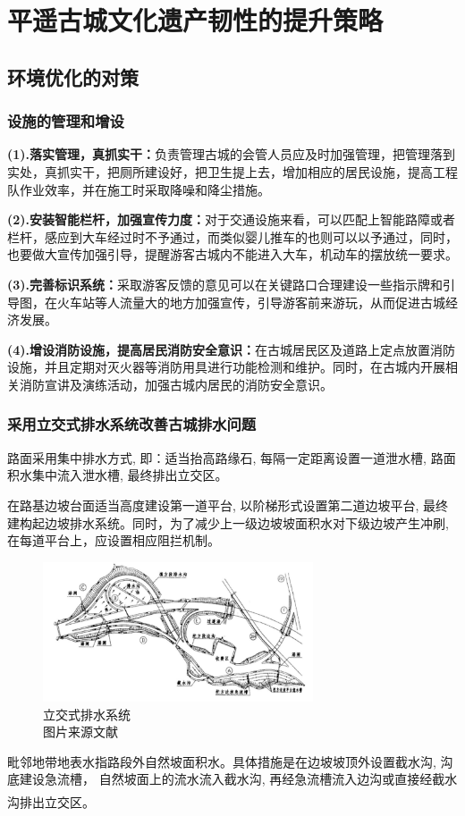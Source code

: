 \documentclass[UTF8]{ctexart}
\newcommand{\upcite}[1]{\textsuperscript{\textsuperscript{\cite{#1}}}}
\begin{document}
\section{平遥古城文化遗产韧性的提升策略}
    \subsection{环境优化的对策}
        \subsubsection{设施的管理和增设}
\textbf{(1).落实管理，真抓实干：}负责管理古城的会管人员应及时加强管理，把管理落到实处，真抓实干，把厕所建设好，把卫生提上去，增加相应的居民设施，提高工程队作业效率，并在施工时采取降噪和降尘措施。

\textbf{(2).安装智能栏杆，加强宣传力度：}对于交通设施来看，可以匹配上智能路障或者栏杆，感应到大车经过时不予通过，而类似婴儿推车的也则可以以予通过，同时，也要做大宣传加强引导，提醒游客古城内不能进入大车，机动车的摆放统一要求。

\textbf{(3).完善标识系统：}采取游客反馈的意见可以在关键路口合理建设一些指示牌和引导图，在火车站等人流量大的地方加强宣传，引导游客前来游玩，从而促进古城经济发展。

\textbf{(4).增设消防设施，提高居民消防安全意识：}在古城居民区及道路上定点放置消防设施，并且定期对灭火器等消防用具进行功能检测和维护。同时，在古城内开展相关消防宣讲及演练活动，加强古城内居民的消防安全意识。

        \subsubsection{采用立交式排水系统改善古城排水问题}
        路面采用集中排水方式, 即：适当抬高路缘石, 每隔一定距离设置一道泄水槽, 路面积水集中流入泄水槽, 最终排出立交区。

        在路基边坡台面适当高度建设第一道平台, 以阶梯形式设置第二道边坡平台, 最终建构起边坡排水系统。同时，为了减少上一级边坡坡面积水对下级边坡产生冲刷, 在每道平台上，应设置相应阻拦机制。
        \begin{figure}[H]
    \centering
    \includegraphics[width=8cm]{排水.png}
    \caption[plain]{立交式排水系统\\图片来源文献\cite{魏明祥2002丹东古城互通式立交的排水设计}}
    \label{fig:my_label}
        \end{figure}
        毗邻地带地表水指路段外自然坡面积水。具体措施是在边坡坡顶外设置截水沟, 沟底建设急流槽， 自然坡面上的流水流入截水沟, 再经急流槽流入边沟或直接经截水沟排出立交区。\upcite{赵阔宇2011浅谈边坡生态防护技术在古城墙保护中绿化的应用}
\end{document}
